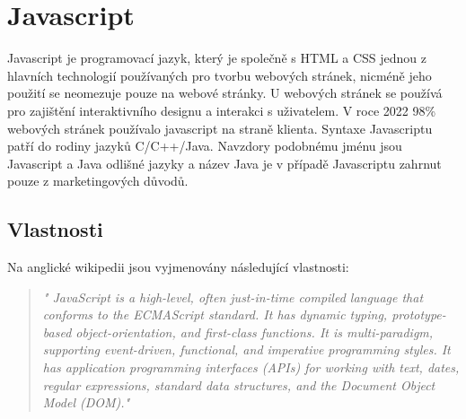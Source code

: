 \documentclass[main.tex]{subfiles}
\begin{document}
\section{Javascript}
Javascript je programovací jazyk, který je společně s HTML a CSS jednou z hlavních technologií používaných pro tvorbu webových stránek, nicméně jeho použití se neomezuje pouze na webové stránky. U webových stránek se používá pro zajištění interaktivního designu a interakci s uživatelem. V roce 2022 98\% webových stránek používalo javascript na straně klienta. Syntaxe Javascriptu patří do rodiny jazyků C/C++/Java. Navzdory podobnému jménu jsou Javascript a Java odlišné jazyky a název Java je v případě Javascriptu zahrnut pouze z marketingových důvodů.


\subsection{Vlastnosti}
Na anglické wikipedii jsou vyjmenovány následující vlastnosti:
\begin{quote} \textit{" JavaScript is a high-level, often just-in-time compiled language that conforms to the ECMAScript standard. It has dynamic typing, prototype-based object-orientation, and first-class functions. It is multi-paradigm, supporting event-driven, functional, and imperative programming styles. It has application programming interfaces (APIs) for working with text, dates, regular expressions, standard data structures, and the Document Object Model (DOM)." } \end{quote}
\end{document}
